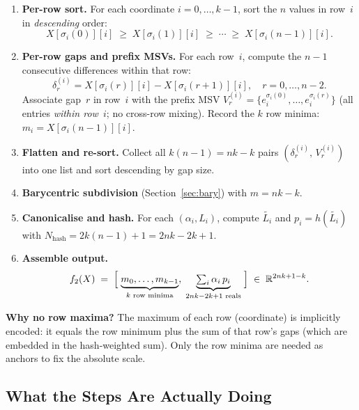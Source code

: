 \documentclass[11pt,a4paper]{article}
\newcommand{\eji}[2]{e^{#1}_{#2}}           %
\newcommand{\hash}[1]{h\!\left(#1\right)}   %
\newcommand{\canon}[1]{\widetilde{#1}}      %
\newcommand{\R}{\mathbb{R}}
\begin{document}
\begin{enumerate}[leftmargin=*]
  \item \textbf{Per-row sort.}  For each coordinate $i = 0, \ldots, k{-}1$,
        sort the $n$ values in row~$i$ in \emph{descending} order:
        \[
          X[\sigma_i(0)][i] \;\ge\; X[\sigma_i(1)][i] \;\ge\; \cdots \;\ge\; X[\sigma_i(n-1)][i].
        \]

  \item \textbf{Per-row gaps and prefix MSVs.}  For each row~$i$,
        compute the $n-1$ consecutive differences within that row:
        \[
          \delta^{(i)}_r = X[\sigma_i(r)][i] - X[\sigma_i(r+1)][i], \quad r = 0,\ldots,n-2.
        \]
        Associate gap~$r$ in row~$i$ with the prefix MSV
        $V^{(i)}_r = \{\eji{\sigma_i(0)}{i}, \ldots, \eji{\sigma_i(r)}{i}\}$
        (all entries \emph{within row~$i$}; no cross-row mixing).
        Record the $k$ row minima: $m_i = X[\sigma_i(n-1)][i]$.

  \item \textbf{Flatten and re-sort.}  Collect all $k(n-1) = nk-k$ pairs
        $(\delta^{(i)}_r,\, V^{(i)}_r)$ into one list and sort descending by gap size.

  \item \textbf{Barycentric subdivision} (Section~\ref{sec:bary}) with
        $m = nk - k$.

  \item \textbf{Canonicalise and hash.}  For each $(\alpha_i, L_i)$, compute
        $\canon{L_i}$ and $p_i = \hash{\canon{L_i}}$ with
        $N_{\text{hash}} = 2k(n-1)+1 = 2nk-2k+1$.

  \item \textbf{Assemble output.}
        \[
          f_2(X) \;=\; \Bigl[\;\underbrace{m_0,\ldots,m_{k-1}}_{k\text{ row minima}},\;
                               \underbrace{\textstyle\sum_i \alpha_i\,p_i}_{2nk-2k+1\text{ reals}}
                               \;\Bigr]
          \;\in\; \R^{2nk+1-k}.
        \]
\end{enumerate}

\begin{tcolorbox}[notebox]
\textbf{Why no row maxima?}  The maximum of each row (coordinate) is implicitly
encoded: it equals the row minimum plus the sum of that row's gaps
(which are embedded in the hash-weighted sum).  Only the row minima are needed as
anchors to fix the absolute scale.
\end{tcolorbox}

\subsection*{What the Steps Are Actually Doing}
\end{document}
